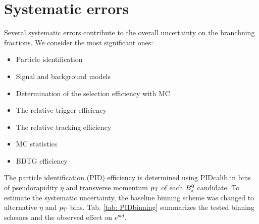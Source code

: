 \section{Systematic errors}
\label{sec: systematics}

Several systematic errors contribute to the overall uncertainty on the branchning fractions. We consider the most significant ones:

\begin{itemize}

\item Particle identification

\item Signal and background models

\item Determination of the selection efficiency with MC

\item The relative trigger efficiency

\item The relative tracking efficiency

\item MC statistics

\item BDTG efficiency

\end{itemize} 

The particle identification (PID) efficiency is determined using PIDcalib in bins of pseudorapidity $\eta$ and transverse momentum $\mbox{$p_{\mathrm{ T}}$}$ of each ${{B}^0_{s}}$ candidate. 
To estimate the systematic uncertainty, the baseline binning scheme was changed to alternative $\eta$ and $\mbox{$p_{\mathrm{ T}}$}$ bins. 
Tab. \ref{tab: PIDbinning} summarizes the tested binning schemes and the observed effect on $\epsilon^{pid}$. 

